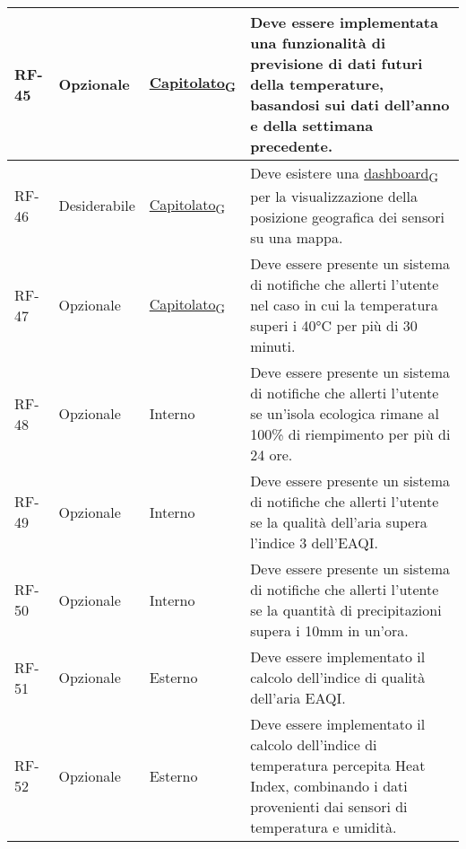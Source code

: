 \begin{longtable}{|>{\centering\arraybackslash}m{}|>{\centering\arraybackslash}m{}|>{\centering\arraybackslash}m{}|>{\centering\arraybackslash}m{}|}
	\\\hline
	RF-45           & Opzionale           & \href{https://7last.github.io/docs/rtb/documentazione-interna/glossario\#capitolato}{Capitolato\textsubscript{G}} & Deve essere implementata una funzionalità di previsione di dati futuri della temperature, basandosi sui dati dell'anno e della settimana precedente.
	\\\hline
	RF-46           & Desiderabile        & \href{https://7last.github.io/docs/rtb/documentazione-interna/glossario\#capitolato}{Capitolato\textsubscript{G}} & Deve esistere una \href{https://7last.github.io/docs/rtb/documentazione-interna/glossario\#dashboard}{dashboard\textsubscript{G}} per la visualizzazione della posizione geografica dei sensori su una mappa.
	\\\hline
	RF-47           & Opzionale           & \href{https://7last.github.io/docs/rtb/documentazione-interna/glossario\#capitolato}{Capitolato\textsubscript{G}} & Deve essere presente un sistema di notifiche che allerti l'utente nel caso in cui la temperatura superi i 40°C per più di 30 minuti.
	\\\hline
	RF-48           & Opzionale           & Interno                                                                                                           & Deve essere presente un sistema di notifiche che allerti l'utente se un'isola ecologica rimane al 100\% di riempimento per più di 24 ore.
	\\\hline
	RF-49           & Opzionale           & Interno                                                                                                           & Deve essere presente un sistema di notifiche che allerti l'utente se la qualità dell'aria supera l'indice 3 dell'EAQI.
	\\\hline
	RF-50           & Opzionale           & Interno                                                                                                           & Deve essere presente un sistema di notifiche che allerti l'utente se la quantità di precipitazioni supera i 10mm in un'ora.
	\\\hline
	RF-51           & Opzionale           & Esterno                                                                                                           & Deve essere implementato il calcolo dell'indice di qualità dell'aria EAQI.
	\\\hline
	RF-52           & Opzionale           & Esterno                                                                                                           & Deve essere implementato il calcolo dell'indice di temperatura percepita Heat Index, combinando i dati provenienti dai sensori di temperatura e umidità.

\end{longtable}
